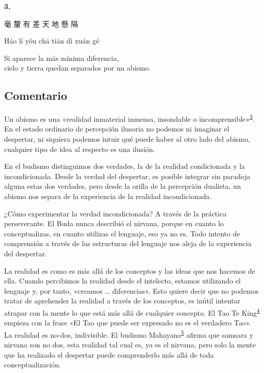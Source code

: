 \documentclass[
  a5paperpaper,
]{article}
\begin{document}
\hfill\break

\hypertarget{03}{}
\begin{verseblock}

\newpage

\begin{center}\textbf{3.}\end{center}

毫 釐 有 差 天 地 懸 隔

Háo lí yŏu chā tiān dì xuán gé

Si aparece la más mínima diferencia,\\
cielo y tierra quedan separados por un abismo.

\end{verseblock}

\hfill\break

\hypertarget{comentario-2}{%
\subsection{Comentario}\label{comentario-2}}

Un abismo es una «realidad inmaterial inmensa, insondable o
incomprensible»\textsuperscript{\protect\hypertarget{ref3}{\protect\hyperlink{nota3}{3}}}.
En el estado ordinario de percepción ilusoria no podemos ni imaginar el
despertar, ni siquiera podemos intuir qué puede haber al otro lado del
abismo, cualquier tipo de idea al respecto es una ilusión.

En el budismo distinguimos dos verdades, la de la realidad condicionada
y la incondicionada. Desde la verdad del despertar, es posible integrar
sin paradoja alguna estas dos verdades, pero desde la orilla de la
percepción dualista, un abismo nos separa de la experiencia de la
realidad incondicionada.

¿Cómo experimentar la verdad incondicionada? A través de la práctica
perseverante. El Buda nunca describió el nirvana, porque en cuanto lo
conceptualizas, en cuanto utilizas el lenguaje, eso ya no es. Todo
intento de comprensión a través de las estructuras del lenguaje nos
aleja de la experiencia del despertar.

La realidad es como es más allá de los conceptos y las ideas que nos
hacemos de ella. Cuando percibimos la realidad desde el intelecto,
estamos utilizando el lenguaje y, por tanto, «creamos \ldots{}
diferencias». Esto quiere decir que no podemos tratar de aprehender la
realidad a través de los conceptos, es inútil intentar atrapar con la
mente lo que está más allá de cualquier concepto. El Tao Te
King\textsuperscript{\protect\hypertarget{ref4}{\protect\hyperlink{nota4}{4}}}
empieza con la frase «El Tao que puede ser expresado no es el verdadero
Tao». La realidad es no-dos, indivisible. El budismo
Mahayana\textsuperscript{\protect\hypertarget{ref5}{\protect\hyperlink{nota4}{5}}}
afirma que samsara y nirvana son no dos, esta realidad tal cual es, ya
es el nirvana, pero solo la mente que ha realizado el despertar puede
comprenderlo más allá de toda conceptualización.
\end{document}
